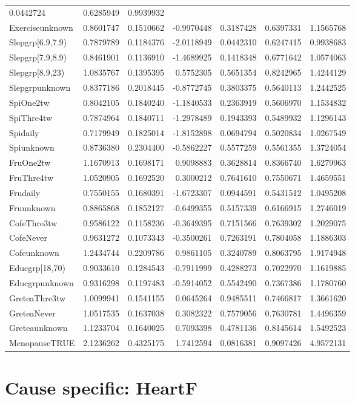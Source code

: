\documentclass[]{article}
\begin{document}
\begin{longtable}[]{@{}lrrrrrr@{}}
0.0442724 & 0.6285949 & 0.9939932\tabularnewline
Exerciseunknown & 0.8601747 & 0.1510662 & -0.9970448 & 0.3187428 &
0.6397331 & 1.1565768\tabularnewline
Slepgrp{[}6.9,7.9) & 0.7879789 & 0.1184376 & -2.0118949 & 0.0442310 &
0.6247415 & 0.9938683\tabularnewline
Slepgrp{[}7.9,8.9) & 0.8461901 & 0.1136910 & -1.4689925 & 0.1418348 &
0.6771642 & 1.0574063\tabularnewline
Slepgrp{[}8.9,23) & 1.0835767 & 0.1395395 & 0.5752305 & 0.5651354 &
0.8242965 & 1.4244129\tabularnewline
Slepgrpunknown & 0.8377186 & 0.2018445 & -0.8772745 & 0.3803375 &
0.5640113 & 1.2442525\tabularnewline
SpiOne2tw & 0.8042105 & 0.1840240 & -1.1840533 & 0.2363919 & 0.5606970 &
1.1534832\tabularnewline
SpiThre4tw & 0.7874964 & 0.1840711 & -1.2978489 & 0.1943393 & 0.5489932
& 1.1296143\tabularnewline
Spidaily & 0.7179949 & 0.1825014 & -1.8152898 & 0.0694794 & 0.5020834 &
1.0267549\tabularnewline
Spiunknown & 0.8736380 & 0.2304400 & -0.5862227 & 0.5577259 & 0.5561355
& 1.3724054\tabularnewline
FruOne2tw & 1.1670913 & 0.1698171 & 0.9098883 & 0.3628814 & 0.8366740 &
1.6279963\tabularnewline
FruThre4tw & 1.0520905 & 0.1692520 & 0.3000212 & 0.7641610 & 0.7550671 &
1.4659551\tabularnewline
Frudaily & 0.7550155 & 0.1680391 & -1.6723307 & 0.0944591 & 0.5431512 &
1.0495208\tabularnewline
Fruunknown & 0.8865868 & 0.1852127 & -0.6499355 & 0.5157339 & 0.6166915
& 1.2746019\tabularnewline
CofeThre3tw & 0.9586122 & 0.1158236 & -0.3649395 & 0.7151566 & 0.7639302
& 1.2029075\tabularnewline
CofeNever & 0.9631272 & 0.1073343 & -0.3500261 & 0.7263191 & 0.7804058 &
1.1886303\tabularnewline
Cofeunknown & 1.2434744 & 0.2209786 & 0.9861105 & 0.3240789 & 0.8063795
& 1.9174948\tabularnewline
Educgrp{[}18,70) & 0.9033610 & 0.1284543 & -0.7911999 & 0.4288273 &
0.7022970 & 1.1619885\tabularnewline
Educgrpunknown & 0.9316298 & 0.1197483 & -0.5914052 & 0.5542490 &
0.7367386 & 1.1780760\tabularnewline
GreteaThre3tw & 1.0099941 & 0.1541155 & 0.0645264 & 0.9485511 &
0.7466817 & 1.3661620\tabularnewline
GreteaNever & 1.0517535 & 0.1637038 & 0.3082322 & 0.7579056 & 0.7630781
& 1.4496359\tabularnewline
Greteaunknown & 1.1233704 & 0.1640025 & 0.7093398 & 0.4781136 &
0.8145614 & 1.5492523\tabularnewline
MenopauseTRUE & 2.1236262 & 0.4325175 & 1.7412594 & 0.0816381 &
0.9097426 & 4.9572131\tabularnewline
\bottomrule
\end{longtable}

\hypertarget{cause-specific-heartf}{%
\section{Cause specific: HeartF}\label{cause-specific-heartf}}
\end{document}
